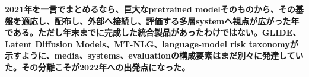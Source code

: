 \noindent\textbf{2021年を一言でまとめるなら、巨大なpretrained modelそのものから、その基盤を適応し、配布し、外部へ接続し、評価する多層systemへ視点が広がった年である。ただし年末までに完成した統合製品があったわけではない。GLIDE、Latent Diffusion Models、MT-NLG、language-model risk taxonomyが示すように、media、systems、evaluationの構成要素はまだ別々に発達していた。その分離こそが2022年への出発点になった。}\autocite{src-20fd9bba2e7a,src-50244427230b,src-a4561c635fe6,src-b307b4b82867}
